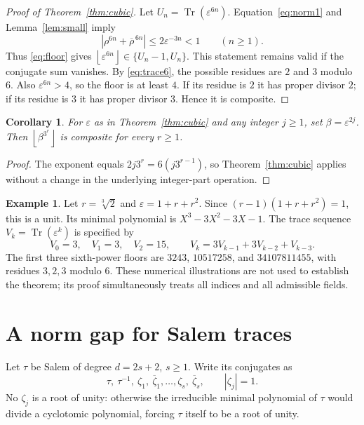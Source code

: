 \documentclass[11pt,a4paper]{article}
\newtheorem{corollary}[theorem]{Corollary}
\theoremstyle{definition}\newtheorem{definition}[theorem]{Definition}
\newtheorem{example}[theorem]{Example}
\theoremstyle{remark}\newtheorem{remark}[theorem]{Remark}
\DeclareMathOperator{\Tr}{Tr}\DeclareMathOperator{\Norm}{N}\DeclareMathOperator{\trdeg}{trdeg}\DeclareMathOperator{\ord}{ord}\DeclareMathOperator{\lcm}{lcm}
\newcommand{\floor}[1]{\left\lfloor #1\right\rfloor}\newcommand{\ceil}[1]{\left\lceil #1\right\rceil}
\begin{document}
\begin{proof}[Proof of Theorem~\ref{thm:cubic}]
Let $U_n=\Tr(\varepsilon^{6n})$. Equation~\eqref{eq:norm1} and Lemma~\ref{lem:small} imply
\[
 |\rho^{6n}+\overline\rho^{\,6n}|
 \le2\varepsilon^{-3n}<1\qquad(n\ge1).
\]
Thus \eqref{eq:floor} gives $\floor{\varepsilon^{6n}}\in\{U_n-1,U_n\}$. This statement remains valid if the conjugate sum vanishes. By \eqref{eq:trace6}, the possible residues are $2$ and $3$ modulo $6$. Also $\varepsilon^{6n}>4$, so the floor is at least $4$. If its residue is $2$ it has proper divisor $2$; if its residue is $3$ it has proper divisor $3$. Hence it is composite.
\end{proof}

\begin{corollary}\label{cor:cubicsparse}
For $\varepsilon$ as in Theorem~\ref{thm:cubic} and any integer $j\ge1$, set $\beta=\varepsilon^{2j}$. Then $\floor{\beta^{3^r}}$ is composite for every $r\ge1$.
\end{corollary}
\begin{proof}
The exponent equals $2j3^r=6(j3^{r-1})$, so Theorem~\ref{thm:cubic} applies without a change in the underlying integer-part operation.
\end{proof}

\begin{example}
Let $r=\sqrt[3]{2}$ and $\varepsilon=1+r+r^2$. Since $(r-1)(1+r+r^2)=1$, this is a unit. Its minimal polynomial is $X^3-3X^2-3X-1$. The trace sequence $V_k=\Tr(\varepsilon^k)$ is specified by
\[
 V_0=3,\quad V_1=3,\quad V_2=15,\qquad
 V_k=3V_{k-1}+3V_{k-2}+V_{k-3}.
\]
The first three sixth-power floors are $3243$, $10517258$, and $34107811455$, with residues $3,2,3$ modulo $6$. These numerical illustrations are not used to establish the theorem; its proof simultaneously treats all indices and all admissible fields.
\end{example}

\section{A norm gap for Salem traces}
Let $\tau$ be Salem of degree $d=2s+2$, $s\ge1$. Write its conjugates as
\[
 \tau,\ \tau^{-1},\ \zeta_1,\ \overline\zeta_1,\ldots,
 \zeta_s,\ \overline\zeta_s,\qquad |\zeta_j|=1.
\]
No $\zeta_j$ is a root of unity: otherwise the irreducible minimal polynomial of $\tau$ would divide a cyclotomic polynomial, forcing $\tau$ itself to be a root of unity.
\end{document}
